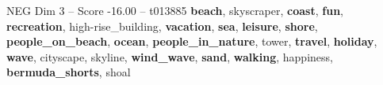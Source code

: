 \begin{textsample}{NEG Dim 3 – Score -16.00 – t013885}  \label{ex:f3_neg_021}
\textbf{beach}, skyscraper, \textbf{coast}, \textbf{fun}, \textbf{recreation}, high-rise\_building, \textbf{vacation}, \textbf{sea}, \textbf{leisure}, \textbf{shore}, \textbf{people\_on\_beach}, \textbf{ocean}, \textbf{people\_in\_nature}, tower, \textbf{travel}, \textbf{holiday}, \textbf{wave}, cityscape, skyline, \textbf{wind\_wave}, \textbf{sand}, \textbf{walking}, happiness, \textbf{bermuda\_shorts}, shoal

\end{textsample}
